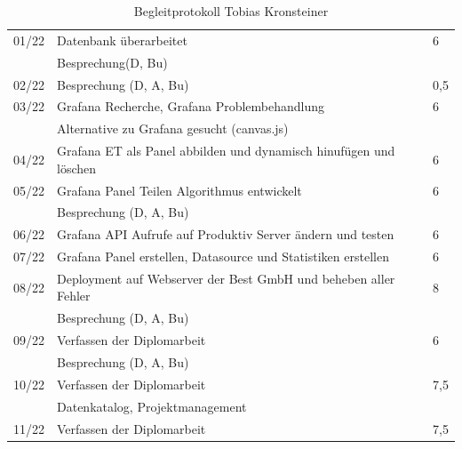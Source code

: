 \begin{table}[h]
\begin{tabular}{|l|l|l|}
		
		
		
		01/22   & Datenbank überarbeitet & 6	\\ 
	&Besprechung(D, Bu) & \\	\hline
		
		
		
		
		02/22   & Besprechung (D, A, Bu)  & 0,5	\\ \hline
		
		
		03/22   & Grafana Recherche, Grafana Problembehandlung  & 6	\\
		
			&Alternative zu Grafana gesucht (canvas.js)& \\
		
		 \hline
		
		
		
		
		
		
		04/22   & Grafana ET als Panel abbilden und dynamisch hinufügen und löschen & 6	\\ \hline
		
		
		05/22   & Grafana Panel Teilen Algorithmus entwickelt & 6	\\ 
		
	&Besprechung (D, A, Bu)& \\	\hline
		
		
		06/22   & Grafana API Aufrufe auf Produktiv Server ändern und testen& 6	\\ \hline
		
		
		
		07/22   & Grafana Panel erstellen, Datasource und Statistiken erstellen  & 6 \\ \hline
		
		
		
		08/22   &Deployment auf Webserver der Best GmbH und beheben aller Fehler & 8 \\
			& Besprechung (D, A, Bu) &	\\ \hline
		
		
		
		
		
		
		
		
		09/22   &Verfassen der Diplomarbeit& 6 \\ 
		& Besprechung (D, A, Bu) &	\\ \hline
		
		
		
		
		10/22   &Verfassen der Diplomarbeit& 7,5\\ 
			& Datenkatalog, Projektmanagement &	\\ \hline
			
					11/22   &Verfassen der Diplomarbeit& 7,5\\  \hline
			
		
	
		
		
		
		
		
		
	\end{tabular}
	\caption{Begleitprotokoll Tobias Kronsteiner}
\label{tab:Begleitprotokoll Tobias Kronsteiner}
\end{table}
\newpage
